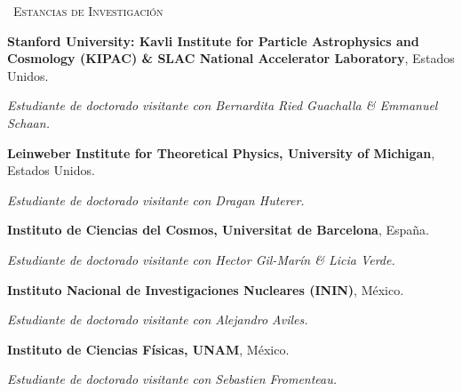 \begin{rubric}{\faPlane\ \textsc{Estancias de Investigación}}

\entry*[Julio, 2025]
	\textbf{Stanford University: Kavli Institute for Particle Astrophysics and Cosmology (KIPAC) \& SLAC National Accelerator Laboratory}, Estados Unidos. \par
\textit{Estudiante de doctorado visitante con Bernardita Ried Guachalla \& Emmanuel Schaan.}

	\textbf{Leinweber Institute for Theoretical Physics, University of Michigan}, Estados Unidos. \par
\textit{Estudiante de doctorado visitante con Dragan Huterer.}

	\textbf{Instituto de Ciencias del Cosmos, Universitat de Barcelona}, España. \par
\textit{Estudiante de doctorado visitante con Hector Gil-Marín \& Licia Verde.}

\entry*[2022--2024]
	\textbf{Instituto Nacional de Investigaciones Nucleares (ININ)}, México. \par
\textit{Estudiante de doctorado visitante con Alejandro Aviles.}

	\textbf{Instituto de Ciencias Físicas, UNAM}, México. \par
\textit{Estudiante de doctorado visitante con Sebastien Fromenteau.}

\end{rubric}
